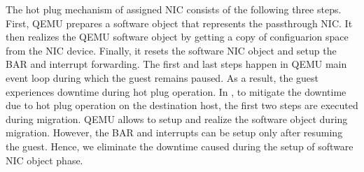 The hot plug mechanism of assigned NIC consists of the
following three steps. First, QEMU prepares a software object
that represents the passthrough NIC. It then realizes the QEMU
software object by getting a copy of configuarion space from
the NIC device. Finally, it resets the software NIC object and
setup the BAR and interrupt forwarding. The first and last
steps happen in QEMU main event loop during which the guest
remains paused. As a result, the guest experiences downtime
during hot plug operation. In \na, to mitigate the downtime
due to hot plug operation on the destination host, the first
two steps are executed during migration. QEMU allows to setup
and realize the software object during migration. However, the
BAR and interrupts can be setup only after resuming the guest.
Hence, we eliminate the downtime caused during the setup of
software NIC object phase.
